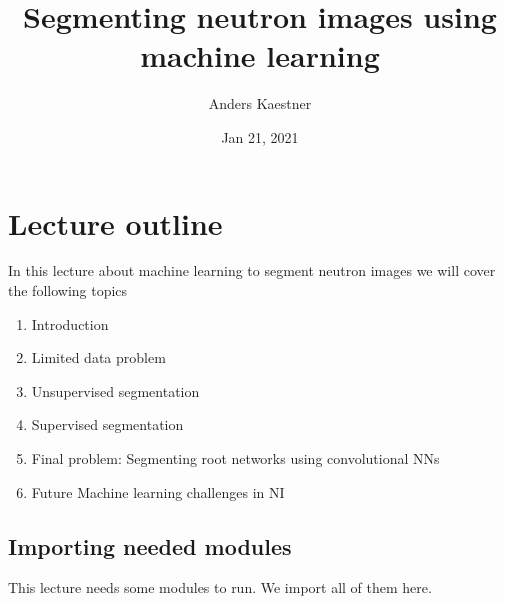 \documentclass[letterpaper,10pt,english]{sphinxmanual}
\title{Segmenting neutron images using machine learning}
\date{Jan 21, 2021}
\author{Anders Kaestner}
\begin{document}
\pagestyle{empty}
\sphinxmaketitle
\pagestyle{plain}
\sphinxtableofcontents
\pagestyle{normal}
\label{\detokenize{ML4NeutronImageSegmentation::doc}}





\chapter{Lecture outline}
\label{\detokenize{ML4NeutronImageSegmentation:lecture-outline}}
In this lecture about machine learning to segment neutron images we will cover the following topics
\begin{enumerate}
%
\item {} 
Introduction

\item {} 
Limited data problem

\item {} 
Unsupervised segmentation

\item {} 
Supervised segmentation

\item {} 
Final problem: Segmenting root networks using convolutional NNs

\item {} 
Future Machine learning challenges in NI

\end{enumerate}


\section{Importing needed modules}
\label{\detokenize{ML4NeutronImageSegmentation:importing-needed-modules}}
This lecture needs some modules to run. We import all of them here.
\end{document}
